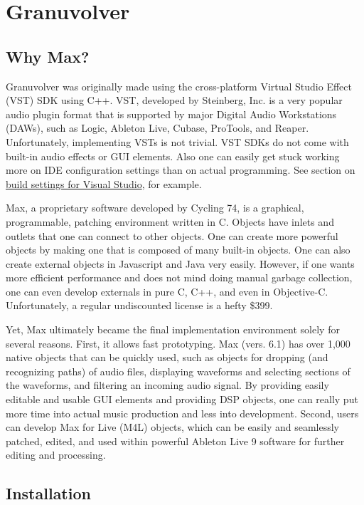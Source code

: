 \documentclass{article}
\begin{document}
	\section{Granuvolver}
		\subsection{Why Max?}
		Granuvolver was originally made using the cross-platform Virtual Studio Effect (VST) SDK using C++. VST, developed by Steinberg, Inc. is a very popular audio plugin format that is supported by major Digital Audio Workstations (DAWs), such as Logic, Ableton Live, Cubase, ProTools, and Reaper.  Unfortunately, implementing VSTs is not trivial. VST SDKs do not come with built-in audio effects or GUI elements. Also one can easily get stuck working more on IDE configuration settings than on actual programming. See section on  \href{http://teragonaudio.com/article/How-to-make-VST-plugins-in-Visual-Studio.html}{build settings for Visual Studio}, for example.

		Max, a proprietary software developed by Cycling 74, is a graphical, programmable, patching environment written in C.  Objects have inlets and outlets that one can connect to other objects. One can create more powerful objects by making one that is composed of many built-in objects. One can also create external objects in Javascript and Java very easily. However, if one wants more efficient performance and does not mind doing manual garbage collection, one can even develop externals in pure C, C++, and even in Objective-C. Unfortunately, a regular undiscounted license is a hefty \$399.

		Yet, Max ultimately became the final implementation environment solely for several reasons. First, it allows fast prototyping. Max (vers. 6.1) has over 1,000 native objects that can be quickly used, such as objects for dropping (and recognizing paths) of audio files, displaying waveforms and selecting sections of the waveforms, and filtering an incoming audio signal. By providing easily editable and usable GUI elements and providing DSP objects, one can really put more time into actual music production and less into development. Second, users can develop Max for Live (M4L) objects, which can be easily and seamlessly patched, edited, and used within powerful Ableton Live 9 software for further editing and processing.
		\subsection{Installation}
\end{document}
